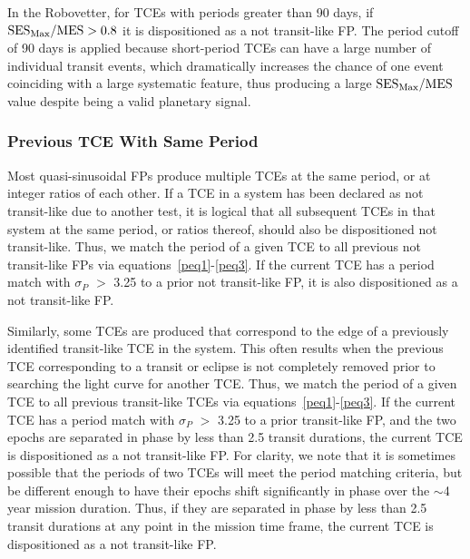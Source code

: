 In the Robovetter, for TCEs with periods greater than 90 days, if ${{\rm SES}_{\rm Max} / {\rm MES} > 0.8}$ it is dispositioned as a not transit-like FP. The period cutoff of 90 days is applied because short-period TCEs can have a large number of individual transit events, which dramatically increases the chance of one event coinciding with a large systematic feature, thus producing a large ${{\rm SES}_{\rm Max} / {\rm MES}}$ value despite being a valid planetary signal.



\subsubsection{Previous TCE With Same Period}
\label{s:sameperiod}
Most quasi-sinusoidal FPs produce multiple TCEs at the same period, or at integer ratios of each other. If a TCE in a system has been declared as not transit-like due to another test, it is logical that all subsequent TCEs in that system at the same period, or ratios thereof, should also be dispositioned not transit-like. Thus, we match the period of a given TCE to all previous not transit-like FPs via equations~\ref{peq1}-\ref{peq3}. If the current TCE has a period match with $\sigma_{P}$ $>$ 3.25 to a prior not transit-like FP, it is also dispositioned as a not transit-like FP.

Similarly, some TCEs are produced that correspond to the edge of a previously identified transit-like TCE in the system. This often results when the previous TCE corresponding to a transit or eclipse is not completely removed prior to searching the light curve for another TCE. Thus, we match the period of a given TCE to all previous transit-like TCEs via equations~\ref{peq1}-\ref{peq3}.  If the current TCE has a period match with $\sigma_{P}$ $>$ 3.25 to a prior transit-like FP, and the two epochs are separated in phase by less than 2.5 transit durations, the current TCE is dispositioned as a not transit-like FP. For clarity, we note that it is sometimes possible that the periods of two TCEs will meet the period matching criteria, but be different enough to have their epochs shift significantly in phase over the $\sim$4 year mission duration. Thus, if they are separated in phase by less than 2.5 transit durations at any point in the mission time frame, the current TCE is dispositioned as a not transit-like FP.



